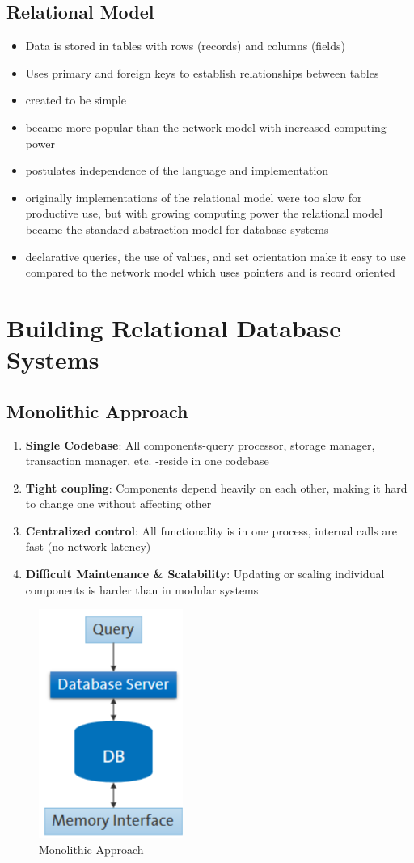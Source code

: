\subsection{Relational Model}
\begin{itemize}
	\item Data is stored in tables with rows (records) and columns (fields)
	\item Uses primary and foreign keys to establish relationships between tables
	\item created to be simple 
	\item became more popular than the network model with increased computing power
	\item postulates independence of the language and implementation
	\item originally implementations of the relational model were too slow for productive use, but with growing computing power the relational model became the standard abstraction model for database systems
	\item declarative queries, the use of values, and set orientation make it easy to use compared to the network model which uses pointers and is record oriented
\end{itemize}

\section{Building Relational Database Systems}
\subsection{Monolithic Approach}
\begin{enumerate}
	\item \textbf{Single Codebase}: All components-query processor, storage manager, transaction manager, etc. -reside in one codebase
	\item \textbf{Tight coupling}: Components depend heavily on each other, making it hard to change one without affecting other
	\item \textbf{Centralized control}: All functionality is in one process, internal calls are fast (no network latency)
	\item \textbf{Difficult Maintenance \& Scalability}: Updating or scaling individual components is harder than in modular systems
\end{enumerate}

\begin{figure}[H]
	\centering
	\includegraphics[width=0.2\linewidth]{media/architectures/monolithicApproach}
	\caption[Monolithic Approach]{Monolithic Approach}
	\label{fig:monolithicapproach}
\end{figure}

